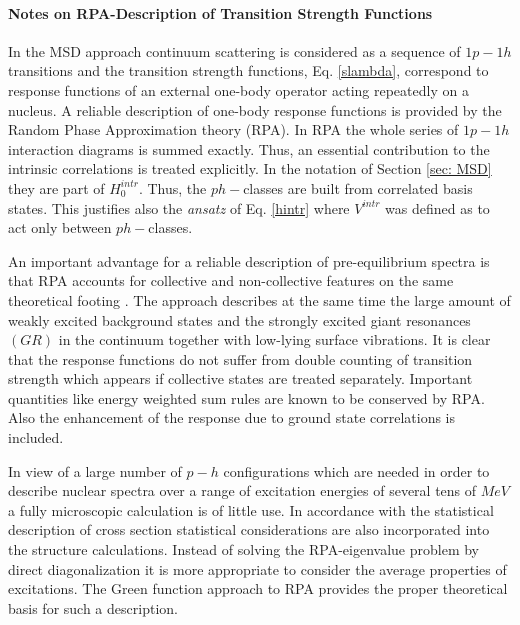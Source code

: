 \documentclass[twocolumn,amsmath,amssymb,10pt,groupedaddress,a4paper]{revtex4}
\begin{document}
\paragraph{Notes on RPA-Description of Transition Strength Functions}
In the MSD approach continuum scattering is considered
as a sequence of $1p-1h$ transitions and the transition strength
functions, Eq. \ref{slambda}, correspond to response functions of
an external one-body operator acting repeatedly on a nucleus. A reliable
description of one-body response functions is provided by the Random
Phase Approximation theory \cite{Neg,Wal} (RPA). In RPA
the whole series of $1p-1h$ interaction diagrams is summed exactly.
Thus, an essential contribution to the intrinsic correlations is treated
explicitly. In the notation of Section \ref{sec: MSD} they are part
of $H_{0}^{intr}$. Thus, the $ph-$classes are built from correlated
basis states. This justifies also the \textit{ansatz} of Eq. \ref{hintr}
where $V^{intr}$ was defined as to act only between $ph-$classes.

An important advantage for a reliable description of pre-equilibrium
spectra is that RPA accounts for collective and non-collective
features on the same theoretical footing \cite{Wal,BM,LW92,SLW,RegT}.
The approach describes at the same time the large amount of weakly
excited background states and the strongly excited giant resonances
$(GR)$ in the continuum together with low-lying surface vibrations.
It is clear that the response functions do not suffer from double
counting of transition strength which appears if collective states
are treated separately. Important quantities like energy weighted
sum rules are known to be conserved by RPA. Also the enhancement
of the response due to ground state correlations is included.

In view of a large number of $p-h$ configurations which are needed
in order to describe nuclear spectra over a range of excitation energies
of several tens of $MeV$ a fully microscopic calculation is of little
use. In accordance with the statistical description of cross section
statistical considerations are also incorporated into the structure
calculations. Instead of solving the RPA-eigenvalue problem
by direct diagonalization it is more appropriate to consider the average
properties of excitations. The Green function approach to RPA
\cite{Wal,LW92} provides the proper theoretical basis for such a
description.
\end{document}
